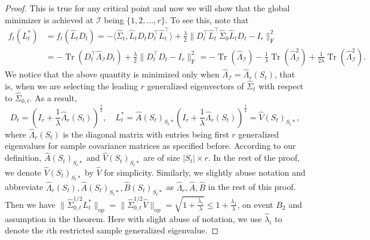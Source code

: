 \documentclass[11pt]{article}
\newcommand{\nb}[1]{\textcolor{orange}{\texttt{[#1]}}}
\newcommand{\ha}{\widehat{A}}
\newcommand{\hb}{\widehat{B}}
\newcommand{\hl}{\widehat{\Lambda}_r}
\newcommand{\hU}{\widehat{V}}
\newcommand{\so}{\widehat{\Sigma}_0}
\newcommand{\sot}{\widehat{\Sigma}_{0,t}}
\newcommand{\cI}{{\mathcal{I}}}
\DeclareMathOperator{\Tr}{Tr}
\newcommand{\0}{{\mathbf{0}}}
\newcommand{\op}{{\mathrm{op}}}
\begin{document}
\begin{proof}
This is true for any critical point and now we will show that the global minimizer is achieved at $\cI$ being $\{1,2,...,r\}$. To see this, note that\begin{align*}
f_t(L^*_t)&=f_t(\widehat{L}_tD_t)=-\langle \widehat{\Sigma}_t,\widehat{L}_tD_tD_t^\top \widehat{L}_t^\top\rangle+\frac{\lambda}{2}\|D_t^\top \widehat{L}_t^\top \so\widehat{L}_tD_t-I_r\|_\mathrm{F}^2\\
&=-\Tr(D_t^\top \widehat{\Lambda}_\cI D_t)+\frac{\lambda}{2}\|D_t^\top D_t-I_r\|_\mathrm{F}^2=-\Tr(\widehat{\Lambda}_\cI)-\frac{1}{\lambda}\Tr(\widehat{\Lambda}_\cI^2)+\frac{1}{2\lambda}\Tr(\widehat{\Lambda}_\cI^2).
\end{align*}
We notice that the above quantity is minimized only when $\widehat{\Lambda}_\cI=\hl(S_t)$, that is, when we are selecting the leading $r$ generalized eigenvectors of $\widehat\Sigma_t$ with respect to $\widehat\Sigma_{0,t}$. 
As a result, 
\begin{equation*}
    D_t=\left(I_r+\frac{1}{\lambda}\hl(S_t)\right)^{\frac{1}{2}},\quad L^*_t=\widehat{A}(S_t)_{S_t*}\left(I_r+\frac{1}{\lambda}\hl(S_t)\right)^{\frac{1}{2}}=\widehat{V}(S_t)_{S_t*},
\end{equation*}
where $\hl(S_t)$ is the diagonal matrix with entries being first $r$ generalized eigenvalues for sample covariance matrices as specified before. According to our definition, $\widehat{A}(S_t)_{S_t*}$ and $\widehat{V}(S_t)_{S_t*}$ are
of size $|S_t|\times r$.
In the rest of the proof, we denote $\widehat{V}(S_t)_{S_t*}$ by $\widehat{V}$ for simplicity. Similarly, we slightly abuse notation and abbreviate $\hl(S_t),\widehat{A}(S_t)_{S_t*},\widehat{B}(S_t)_{S_t*}$ as $\hl,\ha,\hb$ in the rest of this proof. 
Then we have $\|\sot^{1/2} L_t^*\|_\op=\|\sot^{1/2}\hU\|_\op=\sqrt{1+\frac{\widehat{\lambda}_1}{\lambda}}\leq1+\frac{\lambda_1}{\lambda}$, on event $B_2$ and assumption in the theorem. Here with slight abuse of notation, we use $\widehat{\lambda}_i$ to denote the $i$th restricted sample generalized eigenvalue.


\end{proof}
\end{document}

